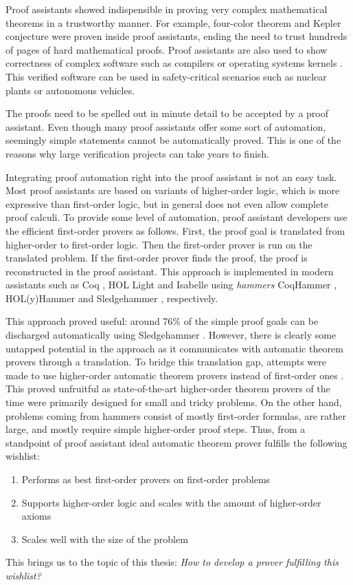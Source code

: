Proof assistants showed indispensible in proving very complex mathematical theorems in a
trustworthy manner. For example, four-color theorem \cite{gg-2008-four-color}
and Kepler conjecture \cite{th-2015-kepler} were proven inside proof assistants,
ending the need to trust hundreds of pages of hard mathematical proofs. Proof
assistants are also used to show correctness of complex software such as
compilers \cite{xl-09-compcert} or operating systems kernels \cite{gk-09-sel4}.
This verified software can be used in safety-critical scenarios such as nuclear
plants or autonomous vehicles.

The proofs need to be spelled out in minute detail to be accepted by a proof assistant.
Even though many proof assistants offer some sort of automation, seemingly simple
statements cannot be automatically proved. This is one of the reasons why large
verification projects can take years to finish.

Integrating proof automation right into the proof assistant is not an easy task.
Most proof assistants are based on variants of higher-order logic, which is more
expressive than first-order logic, but in general does not even allow complete
proof calculi. To provide some level of automation, proof assistant developers
use the efficient first-order provers as follows. First, the proof goal is
translated from higher-order to first-order logic. Then the first-order prover
is run on the translated problem. If the first-order prover finds the proof, the
proof is reconstructed in the proof assistant. This approach is implemented in
modern assistants such as Coq \cite{bc-04-coq}, HOL Light \cite{jh-09-hol-light}
and Isabelle \cite{lc-88-isabelle} using \emph{hammers} CoqHammer
\cite{ck-18-coqhammer}, HOL(y)Hammer \cite{ku-15-holyhammer} and Sledgehammer
\cite{bn-10-sh}, respectively. 

This approach proved useful: around 76\% of the simple proof goals can be
discharged automatically using Sledgehammer \cite{bgkku-16-larning-fact-selector}. However, there is
clearly some untapped potential in the approach as it communicates with
automatic theorem provers through a translation. To bridge this translation gap,
attempts were made to use higher-order automatic theorem provers instead of
first-order ones \cite{ns-13-leo2sh}. This proved unfruitful as state-of-the-art
higher-order theorem provers of the time were primarily designed for small and
tricky problems. On the other hand, problems coming from hammers consist of
mostly first-order formulas, are rather large, and mostly require simple
higher-order proof steps. Thus, from a standpoint of proof assistant ideal
automatic theorem prover fulfills the following wishlist:
\begin{enumerate}
  \item\label{it:fo} Performs as best first-order provers on first-order problems
  \item\label{it:ho} Supports higher-order logic and scales with the amount of higher-order axioms
  \item\label{it:size} Scales well with the size of the problem
\end{enumerate}
This brings us to the topic of this thesis: \emph{How to develop a prover fulfilling this wishlist?}

